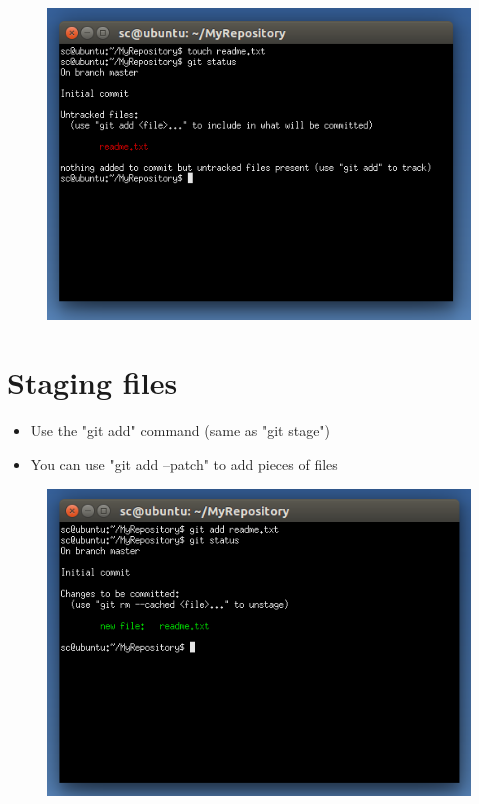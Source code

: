 \documentclass{beamer}
\begin{document}
\begin{frame}
\begin{figure}
\begin{center}
\includegraphics[scale=0.5]{gitstatus1}
\end{center}
\end{figure}
\end{frame}

\section{Staging files}
\begin{frame}
\begin{itemize}
\item Use the "git add" command (same as "git stage")
\item You can use "git add --patch" to add pieces of files
\end{itemize}
\begin{figure}
\begin{center}
\includegraphics[scale=0.5]{gitadd0}
\end{center}
\end{figure}
\end{frame}
\end{document}
